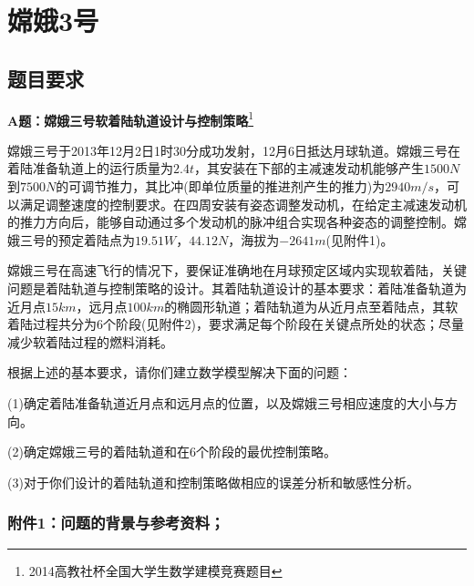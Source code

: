 
\chapter{嫦娥3号}
\section{题目要求}
    \par
    \textbf{A题：嫦娥三号软着陆轨道设计与控制策略}\footnote{2014高教社杯全国大学生数学建模竞赛题目}
    \par
    嫦娥三号于2013年12月2日1时30分成功发射，12月6日抵达月球轨道。嫦娥三号在着陆准备轨道上的运行质量为$2.4t$，其安装在下部的主减速发动机能够产生$1500N$到$7500N$的可调节推力，其比冲(即单位质量的推进剂产生的推力)为$2940m/s$，可以满足调整速度的控制要求。在四周安装有姿态调整发动机，在给定主减速发动机的推力方向后，能够自动通过多个发动机的脉冲组合实现各种姿态的调整控制。嫦娥三号的预定着陆点为$19.51W$，$44.12N$，海拔为$-2641m$(见附件1)。
    \par
    嫦娥三号在高速飞行的情况下，要保证准确地在月球预定区域内实现软着陆，关键问题是着陆轨道与控制策略的设计。其着陆轨道设计的基本要求：着陆准备轨道为近月点$15km$，远月点$100km$的椭圆形轨道；着陆轨道为从近月点至着陆点，其软着陆过程共分为6个阶段(见附件2)，要求满足每个阶段在关键点所处的状态；尽量减少软着陆过程的燃料消耗。
    \par
    根据上述的基本要求，请你们建立数学模型解决下面的问题：
    \par
    (1)确定着陆准备轨道近月点和远月点的位置，以及嫦娥三号相应速度的大小与方向。
    \par
    (2)确定嫦娥三号的着陆轨道和在6个阶段的最优控制策略。
    \par
    (3)对于你们设计的着陆轨道和控制策略做相应的误差分析和敏感性分析。
    \subsection{附件1：问题的背景与参考资料；}
